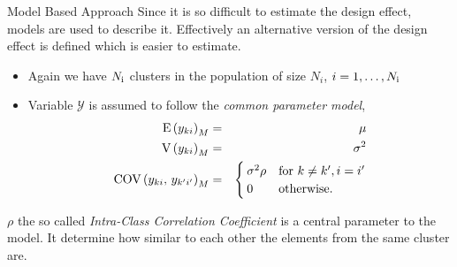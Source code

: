 \documentclass[10pt]{beamer}\usepackage[]{graphicx}\usepackage[]{color}
\newcommand{\E}[1]{\text{E}\left(#1\right)}
\newcommand{\V}[1]{\text{V}\left(#1\right)}
\newcommand{\COV}[2]{\text{COV}\left(#1,\,#2\right)}
\newcommand{\RN}[1]{%
  \textup{\uppercase\expandafter{\romannumeral#1}}%
}
\begin{document}


\begin{frame}{Model Based Approach}
Since it is so difficult to estimate the design effect, models are used to describe it. Effectively an alternative version of the design effect is defined which is easier to estimate.
	\begin{itemize}
		\item Again we have $N_{\RN{1}}$ clusters in the population of size $N_i$, $i=1,\dots,N_{\RN{1}}$
		\item Variable $\mathcal{Y}$ is assumed to follow the \emph{common parameter model},
		\begin{eqnarray*}
		  \E{y_{ki}}_{M} &=& \mu \\
		  \notag\V{ y_{ki}}_{M}	&	=	&	\sigma^2 \\
			\COV{y_{ki}}{y_{k'i'}}_{M}	&	=	&
																\begin{cases}%
																	\sigma^2 \rho & \text{for } k\neq k', i = i'
																	\\
																	0							& \text{otherwise.}
																\end{cases}%
		\end{eqnarray*}%
	\end{itemize}
	$\rho$ the so called \emph{Intra-Class Correlation Coefficient} is a central parameter to the model. It determine how similar to each other the elements from the same cluster are.
	
\end{frame}
\end{document}
